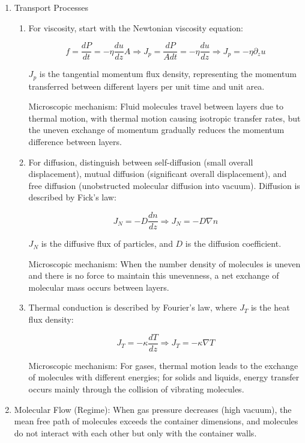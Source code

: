 \begin{enumerate}
\begin{enumerate}
		
		\item Transport Processes
		\begin{enumerate}
			\item For viscosity, start with the Newtonian viscosity equation:
			
			$$
			f=\frac{d P}{d t}=-\eta \frac{d u}{d z} A \Rightarrow J_p=\frac{d P}{A d t}=-\eta \frac{d u}{d z} \Rightarrow J_p=-\eta \partial_z u
			$$
			
			$J_p$ is the tangential momentum flux density, representing the momentum transferred between different layers per unit time and unit area.
			
			Microscopic mechanism: Fluid molecules travel between layers due to thermal motion, with thermal motion causing isotropic transfer rates, but the uneven exchange of momentum gradually reduces the momentum difference between layers.
			
			\item For diffusion, distinguish between self-diffusion (small overall displacement), mutual diffusion (significant overall displacement), and free diffusion (unobstructed molecular diffusion into vacuum). Diffusion is described by Fick's law:
			
			$$
			J_N=-D \frac{d n}{d z} \Rightarrow J_N=-D \nabla n
			$$
			
			$J_N$ is the diffusive flux of particles, and $D$ is the diffusion coefficient.
			
			Microscopic mechanism: When the number density of molecules is uneven and there is no force to maintain this unevenness, a net exchange of molecular mass occurs between layers.
			
			\item Thermal conduction is described by Fourier's law, where $J_T$ is the heat flux density:
			
			$$
			J_T=-\kappa \frac{d T}{d z} \Rightarrow J_T=-\kappa \nabla T
			$$
			
			Microscopic mechanism: For gases, thermal motion leads to the exchange of molecules with different energies; for solids and liquids, energy transfer occurs mainly through the collision of vibrating molecules.
		\end{enumerate}
		
		\item Molecular Flow (Regime): When gas pressure decreases (high vacuum), the mean free path of molecules exceeds the container dimensions, and molecules do not interact with each other but only with the container walls.
		

\end{enumerate}
\end{enumerate}
